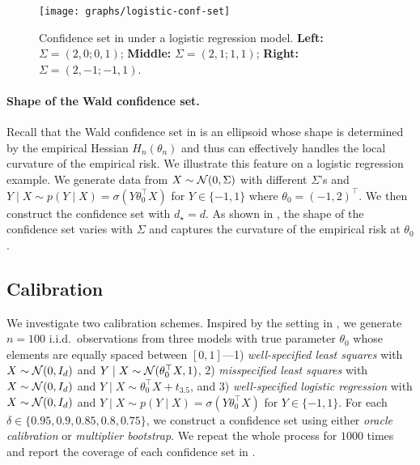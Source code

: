 \begin{figure}
  \centering
  \texttt{[image: graphs/logistic-conf-set]}
  \caption{Confidence set in  under a logistic regression model. \textbf{Left:} $\Sigma = (2, 0; 0, 1)$; \textbf{Middle:} $\Sigma = (2, 1; 1, 1)$; \textbf{Right:} $\Sigma = (2, -1; -1, 1)$.}
  \label{fig:logistic_conf_set}
\end{figure}

\paragraph{Shape of the Wald confidence set.}
Recall that the Wald confidence set in  is an ellipsoid whose shape is determined by the empirical Hessian $H_n(\theta_n)$ and thus can effectively handles the local curvature of the empirical risk.
We illustrate this feature on a logistic regression example.
We generate data from $X \sim \mathcal{N}(0, \Sigma)$ with different $\Sigma$'s and $Y \mid X \sim p(Y \mid X) = \sigma(Y \theta_0^\top X)$ for $Y \in \{-1, 1\}$ where $\theta_0 = (-1, 2)^\top$.
We then construct the confidence set with $d_\star = d$.
As shown in , the shape of the confidence set varies with $\Sigma$ and captures the curvature of the empirical risk at $\theta_0$.

\subsection{Calibration}
\label{sub:bootstrap}

We investigate two calibration schemes.
Inspired by the setting in \citet[Sec.~5.1]{chen2020robust},
we generate $n = 100$ i.i.d.~observations from three models with true parameter $\theta_0$ whose elements are equally spaced between $[0, 1]$---1) \emph{well-specified least squares} with $X \sim \mathcal{N}(0, I_d)$ and $Y \mid X \sim \mathcal{N}(\theta_0^\top X, 1)$, 2) \emph{misspecified least squares} with $X \sim \mathcal{N}(0, I_d)$ and $Y \mid X \sim \theta_0^\top X + t_{3.5}$, and 3) \emph{well-specified logistic regression} with $X \sim \mathcal{N}(0, I_d)$ and $Y \mid X \sim p(Y \mid X) = \sigma(Y \theta_0^\top X)$ for $Y \in \{-1, 1\}$.
For each $\delta \in \{0.95, 0.9, 0.85, 0.8, 0.75\}$, we construct a confidence set using either \emph{oracle calibration} or \emph{multiplier bootstrap}.
We repeat the whole process for $1000$ times and report the coverage of each confidence set in .

